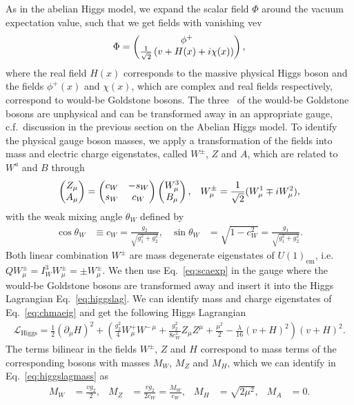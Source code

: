 As in the abelian Higgs model, we expand the scalar field $\Phi$ around the vacuum expectation
value, such that we get fields with vanishing vev
\begin{align}\label{eq:scaexp}
\Phi=\pmqty{\phi^+\\\frac{1}{\sqrt{2}}\left(v+H(x)+i\chi(x)\right)},
\end{align}
where the real field $H(x)$ corresponds to the massive physical Higgs
boson and the fields $\phi^+(x)$ and $\chi(x)$, which are complex and
real fields respectively, correspond to would-be Goldstone bosons. The three \dof~of the
would-be Goldstone bosons are unphysical and can be transformed away in an appropriate
gauge, c.f.\ discussion in the previous section on the
Abelian Higgs model. To identify the physical gauge boson masses, we apply a transformation
of the fields into mass and electric charge eigenstates, called
$W^\pm$, $Z$ and $A$, which are related to $W^a$ and $B$ through
\begin{align}\label{eq:chmaeig}
  \pmqty{Z_\mu\\A_\mu}=\pmqty{c_W & -
    s_W\\s_W & c_W}\pmqty{W_\mu^3\\B_\mu}, && W_\mu^{\pm} =
  \frac{1}{\sqrt{2}}(W_\mu^1\mp i W_\mu^2),
\end{align}
with the weak mixing angle $\theta_W$ defined by
\begin{align}
  \cos\theta_W &\equiv c_W=\frac{g_2}{\sqrt{g_1^2+g_2^2}}, &   \sin\theta_W
  &=\sqrt{1-c_W^2}=\frac{g_1}{\sqrt{g_1^2+g_2^2}}.
\end{align}
Both linear combination $W^\pm$ are mass degenerate eigenstates of
$U(1)_{\text{em}}$, i.e.\ $QW_\mu^\pm= I^3_W W_\mu^\pm = \pm
W^\pm_\mu$. We then use Eq.~\eqref{eq:scaexp} in the gauge where the would-be Goldstone bosons are transformed away and insert it into the Higgs
Lagrangian Eq.~\eqref{eq:higgslag}. We can identify mass and
charge eigenstates of Eq.~\eqref{eq:chmaeig} and get the following
Higgs Lagrangian
\begin{align}\label{eq:higgslagmass}
    \mathcal{L}_{\text{Higgs}} =\frac{1}{2}(\partial_\mu
    H)^2+ \left(\frac{g_2^2}{4}W^+_\mu W^{-\,\mu}+
      \frac{g_2^2}{8c_W^2}Z_\mu Z^{\mu}+\frac{\mu^2}{2}
      -\frac{\lambda}{16}(v+H)^2 \right) (v+H)^2.
\end{align}
The terms bilinear in the fields $W^\pm$, $Z$ and $H$ correspond to
mass terms of the corresponding bosons with masses $M_W$, $M_Z$ and
$M_H$, which we can identify in Eq.~\eqref{eq:higgslagmass} as
\begin{align}
  M_W &= \frac{vg_2}{2}, & M_Z &=\frac{ vg_2}{2c_W}=\frac{M_W}{c_W}, &M_H
  &=\sqrt{2\mu^2}, & M_A&=0.
\end{align}
